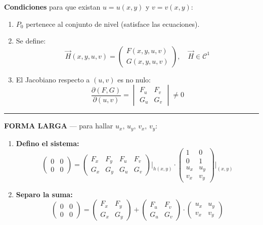 \documentclass[letterpaper, 12pt]{article}
\newenvironment{seccionbox}[1]{%
    \begin{tcolorbox}[
        colback=celesteSuave,
        colframe=azulFuerte,
        coltitle=white,
        fonttitle=\bfseries\large,
        title=#1,
        arc=6pt,
        boxrule=1pt,
        breakable,
        enhanced,
        before upper={\parskip=4pt}
    ]
}{%
    \end{tcolorbox}
}
\begin{document}
\newpage

\begin{seccionbox}{5. Teorema de la Función Implícita}

\textbf{Condiciones} para que existan $u=u(x,y)$ y $v=v(x,y)$:
\begin{enumerate}
    \item $P_0$ pertenece al conjunto de nivel (satisface las ecuaciones).
    \item Se define:
    $$ \vec{H}(x,y,u,v) = \begin{pmatrix} F(x,y,u,v) \\ G(x,y,u,v) \end{pmatrix}, \quad \vec{H} \in \mathcal{C}^1 $$
    \item El Jacobiano respecto a $(u,v)$ es no nulo:
    $$ \frac{\partial(F,G)}{\partial(u,v)} = \begin{vmatrix} F_u & F_v \\ G_u & G_v \end{vmatrix} \neq 0 $$
\end{enumerate}

\medskip\hrule\medskip

\textbf{FORMA LARGA} — para hallar $u_x,\, u_y,\, v_x,\, v_y$:

\begin{enumerate}
    \item \textbf{Defino el sistema:}
    $$ \begin{pmatrix}0&0\\0&0\end{pmatrix} = \begin{pmatrix}F_x&F_y&F_u&F_v\\G_x&G_y&G_u&G_v\end{pmatrix}\Bigg|_{h(x,y)} \cdot \begin{pmatrix}1&0\\0&1\\u_x&u_y\\v_x&v_y\end{pmatrix}\Bigg|_{(x,y)} $$

    \item \textbf{Separo la suma:}
    $$ \begin{pmatrix}0&0\\0&0\end{pmatrix} = \begin{pmatrix}F_x&F_y\\G_x&G_y\end{pmatrix} + \begin{pmatrix}F_u&F_v\\G_u&G_v\end{pmatrix} \cdot \begin{pmatrix}u_x&u_y\\v_x&v_y\end{pmatrix} $$


\end{enumerate}
\end{seccionbox}
\end{document}
